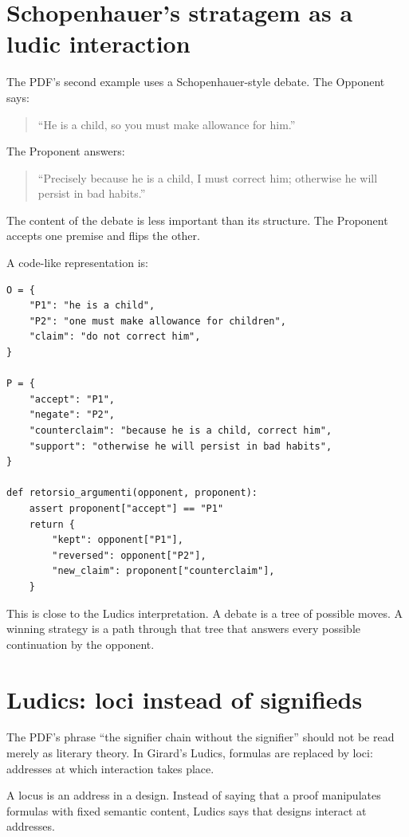 \section{Schopenhauer's stratagem as a ludic interaction}

The PDF's second example uses a Schopenhauer-style debate.  The Opponent says:
\begin{quote}
``He is a child, so you must make allowance for him.''
\end{quote}
The Proponent answers:
\begin{quote}
``Precisely because he is a child, I must correct him; otherwise he will persist in bad habits.''
\end{quote}
The content of the debate is less important than its structure.  The Proponent accepts one premise and flips the other.

A code-like representation is:
\begin{verbatim}
O = {
    "P1": "he is a child",
    "P2": "one must make allowance for children",
    "claim": "do not correct him",
}

P = {
    "accept": "P1",
    "negate": "P2",
    "counterclaim": "because he is a child, correct him",
    "support": "otherwise he will persist in bad habits",
}

def retorsio_argumenti(opponent, proponent):
    assert proponent["accept"] == "P1"
    return {
        "kept": opponent["P1"],
        "reversed": opponent["P2"],
        "new_claim": proponent["counterclaim"],
    }
\end{verbatim}

This is close to the Ludics interpretation.  A debate is a tree of possible moves.  A winning strategy is a path through that tree that answers every possible continuation by the opponent.

\section{Ludics: loci instead of signifieds}

The PDF's phrase ``the signifier chain without the signifier'' should not be read merely as literary theory.  In Girard's Ludics, formulas are replaced by loci: addresses at which interaction takes place.

\begin{definition}
A locus is an address in a design.  Instead of saying that a proof manipulates formulas with fixed semantic content, Ludics says that designs interact at addresses.
\end{definition}

